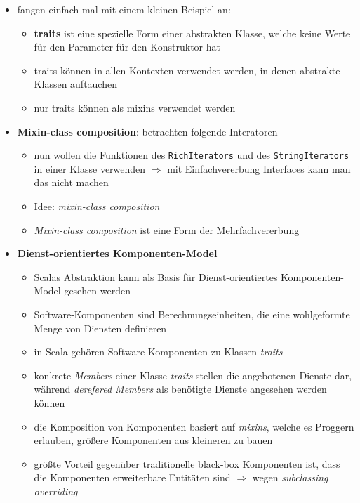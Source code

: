 \begin{itemize}
  \item fangen einfach mal mit einem kleinen Beispiel an:
  
  
  
  \begin{itemize}
    \item \textbf{traits} ist eine spezielle Form einer abstrakten Klasse, welche
    keine Werte für den Parameter für den Konstruktor hat
    \item traits können in allen Kontexten verwendet werden, in denen abstrakte
    Klassen auftauchen
    \item nur traits können als mixins verwendet werden
  \end{itemize}
  
  \item \textbf{Mixin-class composition}: betrachten folgende Interatoren
  
  
  
  \begin{itemize}
    \item nun wollen die Funktionen des \texttt{RichIterators} und des
    \texttt{StringIterators} in einer Klasse verwenden $\Rightarrow$ mit
    Einfachvererbung \und Interfaces kann man das nicht machen
    \item \uline{Idee}: \textit{mixin-class composition}
    
    
    
    \item \textit{Mixin-class composition} ist eine Form der Mehrfachvererbung
  \end{itemize}
  \item \textbf{Dienst-orientiertes Komponenten-Model}
  \begin{itemize}
    \item Scalas Abstraktion kann als Basis für Dienst-orientiertes 
    Komponenten-Model gesehen werden
    \item Software-Komponenten sind Berechnungseinheiten, die eine wohlgeformte
    Menge von Diensten definieren
    \item in Scala gehören Software-Komponenten zu Klassen \und \textit{traits}
    \item konkrete \textit{Members} einer Klasse \oder \textit{traits} stellen
    die angebotenen Dienste dar, während \textit{derefered Members} als
    benötigte Dienste angesehen werden können
    \item die Komposition von Komponenten basiert auf \textit{mixins}, welche
    es Proggern erlauben, größere Komponenten aus kleineren zu bauen
    \item größte Vorteil gegenüber traditionelle black-box Komponenten ist,
    dass die Komponenten erweiterbare Entitäten sind $\Rightarrow$ wegen
    \textit{subclassing} \und \textit{overriding}
  \end{itemize}
\end{itemize}
